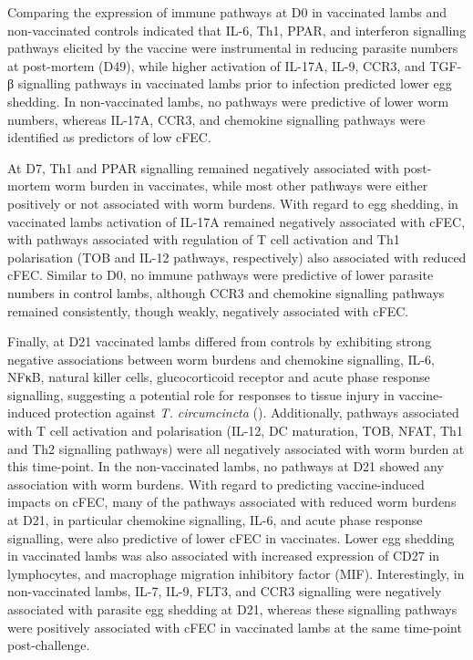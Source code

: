 \documentclass[a4paper, hidelinks, 11pt]{article}
\begin{document}
Comparing the expression of immune pathways at D0 in vaccinated lambs and
non-vaccinated controls indicated that IL-6, Th1, PPAR, and interferon
signalling pathways elicited by the vaccine were instrumental in reducing
parasite numbers at post-mortem (D49), while higher activation of IL-17A, IL-9,
CCR3, and TGF-β signalling pathways in vaccinated lambs prior to infection
predicted lower egg shedding. In non-vaccinated lambs, no pathways were
predictive of lower worm numbers, whereas IL-17A, CCR3, and chemokine
signalling pathways were identified as predictors of low cFEC.

At D7, Th1 and PPAR signalling remained negatively associated with post-mortem
worm burden in vaccinates, while most other pathways were either positively or
not associated with worm burdens. With regard to egg shedding, in vaccinated
lambs activation of IL-17A remained negatively associated with cFEC, with
pathways associated with regulation of T cell activation and Th1 polarisation
(TOB and IL-12 pathways, respectively) also associated with reduced cFEC.
Similar to D0, no immune pathways were predictive of lower parasite numbers in
control lambs, although CCR3 and chemokine signalling pathways remained
consistently, though weakly, negatively associated with cFEC.

Finally, at D21 vaccinated lambs differed from controls by exhibiting strong
negative associations between worm burdens and chemokine signalling, IL-6,
NFκB, natural killer cells, glucocorticoid receptor and acute phase response
signalling, suggesting a potential role for responses to tissue injury in
vaccine-induced protection against \emph{T. circumcincta}
(). Additionally, pathways associated with T cell
activation and polarisation (IL-12, DC maturation, TOB, NFAT, Th1 and Th2
signalling pathways) were all negatively associated with worm burden at this
time-point. In the non-vaccinated lambs, no pathways at D21 showed any
association with worm burdens. With regard to predicting vaccine-induced
impacts on cFEC, many of the pathways associated with reduced worm burdens at
D21, in particular chemokine signalling, IL-6, and acute phase response
signalling, were also predictive of lower cFEC in vaccinates. Lower egg
shedding in vaccinated lambs was also associated with increased expression of
CD27 in lymphocytes, and macrophage migration inhibitory factor (MIF).
Interestingly, in non-vaccinated lambs, IL-7, IL-9, FLT3, and CCR3 signalling
were negatively associated with parasite egg shedding at D21, whereas these
signalling pathways were positively associated with cFEC in vaccinated lambs at
the same time-point post-challenge.
\end{document}
